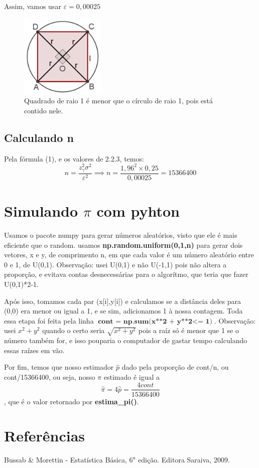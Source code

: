 \documentclass{article}
\begin{document}
Assim, vamos usar $\varepsilon = 0,00025$

\begin{figure}[h]
\centering
\includegraphics[width=0.36\textwidth]{ep1stern1.jpeg}
\caption{\label{fig:ep1stern1} Quadrado de raio 1 é menor que o círculo de raio 1, pois está contido nele. }
\end{figure}

\subsection{Calculando n}
Pela fórmula (1), e os valores de 2.2.3, temos:
\begin{equation}
    n = \frac{z_\gamma^2 \sigma^2}{\varepsilon^2} \implies
    n = \frac{1,96^2 \times 0,25}{0,00025} = 15366400
\end{equation}

\section{Simulando $\pi$ com pyhton}

Usamos o pacote numpy para gerar números aleatórios, visto que ele é mais eficiente que o random. usamos \textbf{np.random.uniform(0,1,n)} para gerar dois vetores, x e y, de comprimento n, em que cada valor é um número aleatório entre 0 e 1, de U(0,1). Observação: usei U(0,1) e não U(-1,1) pois não altera a proporção, e evitava contas desnecessárias para o algorítmo, que teria que fazer U(0,1)*2-1.

Após isso, tomamos cada par (x[i],y[i]) e calculamos se a distância deles para (0,0) era menor ou igual a 1, e se sim, adicionamos 1 à nossa contagem. Toda essa etapa foi feita pela linha $\textbf{cont = np.sum(x**2 + y**2}<\textbf{= 1)}$. Observação: usei $x^2 + y^2$ quando o certo seria $\sqrt{x^2 + y^2}$ pois a raíz só é menor que 1 se o número também for, e isso pouparia o computador de gastar tempo calculando essas raízes em vão.

Por fim, temos que nosso estimador $\widehat{p}$ dado pela proporção de cont/n, ou cont/15366400, ou seja, nosso $\pi$ estimado é igual a 
\[
\widehat{\pi} = 4\widehat{p} = \frac{4cont}{15366400}
\],
que é o valor retornado por \textbf{estima\_pi()}.



\section{Referências}
Bussab \& Morettin - Estatística Básica, $6^a$ edição. Editora Saraiva, 2009.
\end{document}
